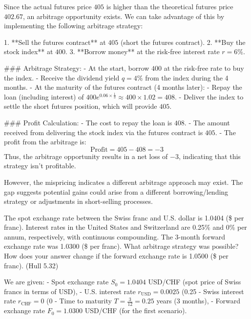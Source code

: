 \documentclass[12pt,letterpaper, onecolumn]{exam}
\begin{document}
\begin{questions}
\begin{solution}
Since the actual futures price \( 405 \) is higher than the theoretical futures price \( 402.67 \), an arbitrage opportunity exists. We can take advantage of this by implementing the following arbitrage strategy:

1. **Sell the futures contract** at \( 405 \) (short the futures contract).
2. **Buy the stock index** at \( 400 \).
3. **Borrow money** at the risk-free interest rate \( r = 6\% \).

### Arbitrage Strategy:
- At the start, borrow \( 400 \) at the risk-free rate to buy the index.
- Receive the dividend yield \( q = 4\% \) from the index during the 4 months.
- At the maturity of the futures contract (4 months later):
  - Repay the loan (including interest) of \( 400 e^{0.06 \times \frac{1}{3}} \approx 400 \times 1.02 = 408 \).
  - Deliver the index to settle the short futures position, which will provide \( 405 \).

### Profit Calculation:
- The cost to repay the loan is \( 408 \).
- The amount received from delivering the stock index via the futures contract is \( 405 \).
- The profit from the arbitrage is:
\[
\text{Profit} = 405 - 408 = -3
\]
Thus, the arbitrage opportunity results in a net loss of \( -3 \), indicating that this strategy isn't profitable.

However, the mispricing indicates a different arbitrage approach may exist. The gap suggests potential gains could arise from a different borrowing/lending strategy or adjustments in short-selling processes.

\end{solution}


\newpage
    \question The spot exchange rate between the Swiss franc and U.S. dollar is 1.0404 (\$ per franc).
Interest rates in the United States and Switzerland are 0.25\% and 0\% per annum,
respectively, with continuous compounding. The 3-month forward exchange rate was
1.0300 (\$ per franc). What arbitrage strategy was possible? How does your answer
change if the forward exchange rate is 1.0500 (\$ per franc). (Hull 5.32)

    \begin{solution}

We are given:
- Spot exchange rate \( S_0 = 1.0404 \) USD/CHF (spot price of Swiss francs in terms of USD),
- U.S. interest rate \( r_{\text{USD}} = 0.0025 \) (0.25%
- Swiss interest rate \( r_{\text{CHF}} = 0 \) (0%
- Time to maturity \( T = \frac{3}{12} = 0.25 \) years (3 months),
- Forward exchange rate \( F_0 = 1.0300 \) USD/CHF (for the first scenario).


\end{solution}
\end{questions}
\end{document}
